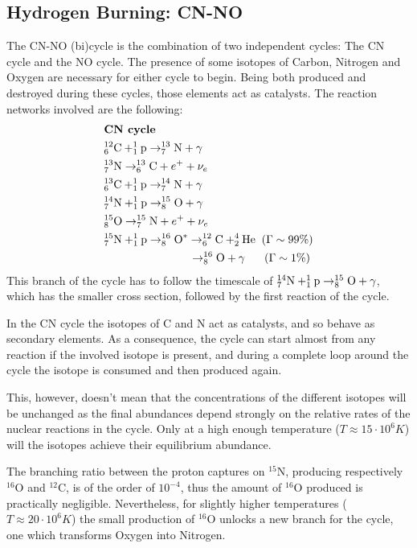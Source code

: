 \subsection{Hydrogen Burning: CN-NO}
The CN-NO (bi)cycle is the combination of two independent cycles: The CN cycle and the NO cycle. The presence of some isotopes of Carbon, Nitrogen and Oxygen are necessary for either cycle to begin. Being both produced and destroyed during these cycles, those elements act as catalysts. The reaction networks involved are the following:
\begin{align*}
    & \text{\textbf{CN cycle}}\\
    & \element{C}{12}{6}+\element{p}{1}{1}\to \element{N}{13}{7}+\gamma\\
    & \element{N}{13}{7}\to \element{C}{13}{6}+e^{+}+\nu_{e}\\
    & \element{C}{13}{6}+\element{p}{1}{1}\to \element{N}{14}{7}+\gamma\\
    & \element{N}{14}{7}+\element{p}{1}{1}\to \element{O}{15}{8}+\gamma\\
    & \element{O}{15}{8}\to \element{N}{15}{7}+e^{+}+\nu_{e}\\
    & \element{N}{15}{7}+\element{p}{1}{1}\to \element{O}{16}{8}^{*}\to \element{C}{12}{6}+\element{He}{4}{2} \;\; (\Gamma \sim 99\%)\\
    &\quad\quad\quad\quad\quad\quad\quad\;\;\to \element{O}{16}{8}+\gamma \quad \;\;\,(\Gamma \sim 1\%)
\end{align*}
This branch of the cycle has to follow the timescale of $\element{N}{14}{7}+\element{p}{1}{1}\to \element{O}{15}{8}+\gamma$, which has the smaller cross section, followed by the first reaction of the cycle.
\par In the CN cycle the isotopes of C and N act as catalysts, and so behave as secondary elements. As a consequence, the cycle can start almost from any reaction if the involved isotope is present, and during a complete loop around the cycle the isotope is consumed and then produced again.
\par This, however, doesn't mean that the concentrations of the different isotopes will be unchanged as the final abundances depend strongly on the relative rates of the nuclear reactions in the cycle. Only at a high enough temperature ($T\approx 15\cdot 10^{6}\unit{K}$) will the isotopes achieve their equilibrium abundance.
\par The branching ratio between the proton captures on $^{15}\text{N}$, producing respectively $^{16}\text{O}$ and $^{12}\text{C}$, is of the order of $10^{-4}$, thus the amount of $^{16}\text{O}$ produced is practically negligible. Nevertheless, for slightly higher temperatures ($T\approx 20\cdot 10^{6}\unit{K}$) the small production of $^{16}\text{O}$ unlocks a new branch for the cycle, one which transforms Oxygen into Nitrogen.
